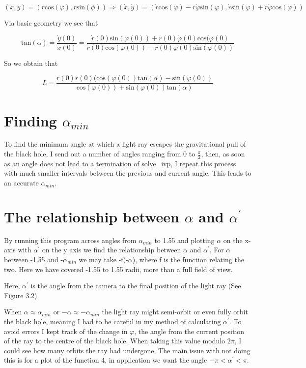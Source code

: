 \documentclass[oneside,openright,frontopenright]{dmathesis}
\begin{document}
			\[(x, y) = (r\mbox{cos}(\varphi), r\mbox{sin}(\phi)) \Rightarrow (\dot{x}, \dot{y}) = (\dot{r}\mbox{cos}(\varphi) - r\dot{\varphi}\mbox{sin}(\varphi), \dot{r}\mbox{sin}(\varphi) + r\dot{\varphi}\mbox{cos}(\varphi))\]
	
	Via basic geometry we see that 
			
			\[\mbox{tan}(\alpha) = \frac{\dot{y}(0)}{\dot{x}(0)} = \frac{\dot{r}(0)\mbox{sin}(\varphi(0)) + r(0)\dot{\varphi}(0)\mbox{cos}(\varphi(0)}{\dot{r}(0)\mbox{cos}(\varphi(0)) - r(0)\dot{\varphi}(0)\mbox{sin}(\varphi(0))}\]

	So we obtain that 

			\[ L = \frac{r(0)\dot{r}(0)(\mbox{cos}(\varphi(0))\mbox{tan}(\alpha)-\mbox{sin}(\varphi(0))}{\mbox{cos}(\varphi(0))+\mbox{sin}(\varphi(0))\mbox{tan}(\alpha)}\]

\section{Finding $\alpha_{min}$}
	
	To find the minimum angle at which a light ray escapes the gravitational pull of the black hole, I send out a number of angles ranging from 0 to $\frac{\pi}{2}$, then, as soon as an angle does not lead to a termination of solve\_ivp, I repeat this process with much smaller intervals between the previous and current angle. This leads to an accurate $\alpha_{min}$.

\section{The relationship between $\alpha$ and $\alpha^{'}$}

	By running this program across angles from $\alpha_{min}$ to 1.55 and plotting $\alpha$ on the x-axis with $\alpha^{'}$ on the y axis we find the relationship between $\alpha$ and $\alpha^{'}$. For $\alpha$ between -1.55 and -$\alpha_{min}$ we may take -f(-$\alpha$), where f is the function relating the two. Here we have covered -1.55 to 1.55 radii, more than a full field of view.

	Here,  $\alpha^{'}$ is the angle from the camera to the final position of the light ray (See Figure 3.2).

	When $\alpha \approx \alpha_{min}$ or $-\alpha \approx -\alpha_{min}$ the light ray might semi-orbit or even fully orbit the black hole, meaning I had to be careful in my method  of calculating $\alpha^{'}$. To avoid errors I kept track of the change in $\varphi$, the angle from the current position of the ray to the centre of the black hole. When taking this value modulo $2\pi$, I could see how many orbits the ray had undergone. The main issue with not doing this is for a plot of the function 4, in application we want the angle $-\pi<\alpha^{'}<\pi$.
\end{document}
